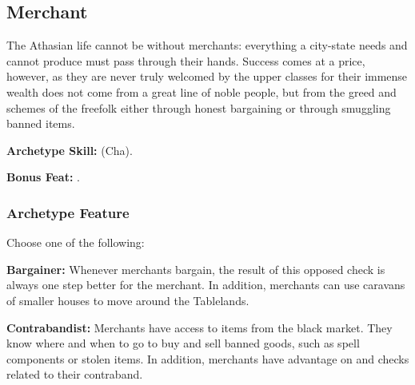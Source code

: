 \subsection{Merchant}
The Athasian life cannot be without merchants: everything a city-state needs and  cannot produce must pass through their hands. Success comes at a price, however, as they are never truly welcomed by the upper classes for their immense wealth does not come from a great line of noble people, but from the greed and schemes of the freefolk either through honest bargaining or through smuggling banned items.

\textbf{Archetype Skill:}  (Cha).

\textbf{Bonus Feat:} .

\subsubsection{Archetype Feature}
Choose one of the following:

\textbf{Bargainer:} Whenever merchants bargain, the result of this  opposed check is always one step better for the merchant. In addition, merchants can use caravans of smaller houses to move around the Tablelands.

\textbf{Contrabandist:} Merchants have access to items from the black market. They know where and when to go to buy and sell banned goods, such as spell components or stolen items. In addition, merchants have advantage on  and  checks related to their contraband.
